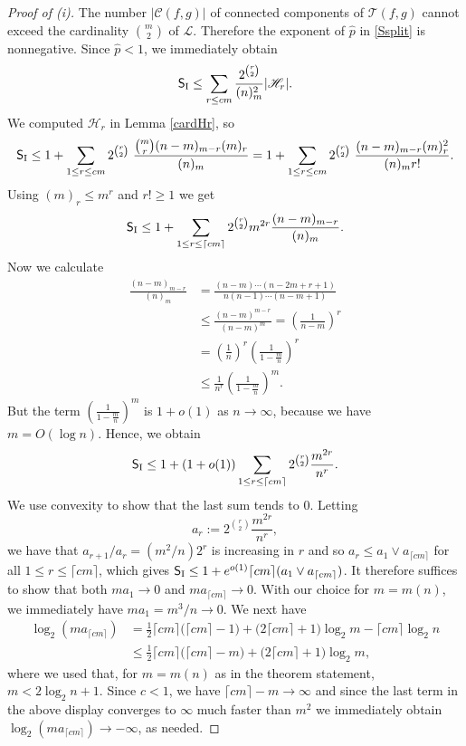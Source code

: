 \documentclass[reqno]{amsart}
\theoremstyle{theorem}
\theoremstyle{definition}
\theoremstyle{remark}
\def\LL{\mathscr{L}}
\def\TT{\mathscr{T}}
\def\CC{\mathscr{C}}
\def\HH{\mathscr{H}}
\newcommand{\1}{{\text{\Large $\mathfrak 1$}}}	%
\numberwithin{equation}{section}
\def\pmax{{\widehat p}}
\def\SSSone{\mathsf S_{\text{\rm I}}}
\begin{document}
\begin{proof}[Proof of (i)]
The number $|\CC(f,g)|$ of connected components of $\TT(f,g)$
cannot exceed the cardinality $\binom{m}{2}$ of $\LL$. Therefore the exponent
of $\pmax$ in \eqref{Ssplit} is nonnegative. 
Since $\pmax < 1$, we immediately obtain
\[
\SSSone \le \sum_{r\le cm} \frac{2^{\binom{r}{2}}}{(n)_m^2} |\HH_r|.
\]
We computed $\HH_r$ in Lemma \ref{cardHr}, so
\[
\SSSone 
\le 1+ \sum_{1 \le r\le cm} 
2^{\binom{r}{2}}~ \frac{\binom{m}{r} (n-m)_{m-r} (m)_r}{(n)_m}
= 1+ \sum_{1 \le r\le cm} 
2^{\binom{r}{2}}~ \frac{(n-m)_{m-r} (m)_r^2}{(n)_m r!}.
\]
Using $(m)_r \le m^r$ and $r!\ge 1$ we get
\[
\SSSone 
\le 1 + \sum_{1\le r\le\lceil cm\rceil} 2^{\binom{r}{2}}
m^{2r} \frac{(n-m)_{m-r}}{(n)_m}.
\]
Now we calculate
\begin{align*}
\frac{(n-m)_{m-r}}{(n)_m}
&= \frac{(n-m) \cdots (n-2m+r+1)}{n(n-1) \cdots (n-m+1)} \\
&\le \frac{(n-m)^{m-r}}{(n-m)^m} = \left( \frac{1}{n-m} \right)^r \\
&= \left( \frac{1}{n} \right)^r \left( \frac{1}{1 - \frac{m}{n}} \right)^r \\
&\le \frac{1}{n^r} \left( \frac{1}{1 - \frac{m}{n}} \right)^m.
\end{align*}
But the term $\left( \frac{1}{1 - \frac{m}{n}} \right)^m$ is $1 + o(1)$ as
$n \rightarrow \infty$, because we have $m = O(\log n)$. Hence, we obtain
\[
\SSSone 
\le 1 + (1 + o(1)) \sum_{1\le r \le \lceil cm \rceil} 2^{\binom{r}{2}}
\frac{m^{2r}}{n^r}.
\]
We use convexity to show that the last sum tends to $0$. Letting
\[
a_r := 2^{\binom{r}{2}} \frac{m^{2r}}{n^r},
\]
we have that $a_{r+1}/a_r = (m^2/n) 2^r$ is increasing in $r$ and so
$a_r \le  a_1 \vee a_{\lceil cm \rceil}$ for all $1 \le r \le \lceil cm \rceil$,
which gives 
$\SSSone \le 1+e^{o(1)} \lceil cm \rceil (a_1\vee a_{\lceil cm \rceil})$.
It therefore suffices to show that both 
$m a_1 \to 0$ and $m a_{\lceil cm \rceil} \to 0$.
With our choice for $m=m(n)$, we immediately have
$m a_1 = {m^3}/{n} \to 0$.
We next have
\begin{align*} 
\log_2 (m a_{\lceil cm\rceil }) 
&= \frac12 \lceil cm\rceil \big(\lceil cm\rceil-1\big)
+\big(2\lceil cm\rceil+ 1\big) \log_2 m -\lceil cm\rceil\log_2 n
\\ 
&\le \frac12 \lceil cm\rceil \big(\lceil cm\rceil-m\big)
+ \big(2\lceil cm\rceil+ 1\big) \log_2 m,
\end{align*}
where we used that, for $m=m(n)$ as in the theorem statement, $m< 2 \log_2 n+1$.
Since $c<1$, we have $\lceil cm\rceil-m \to \infty$
and since the last term in the above display converges to $\infty$ much
faster than $m^2$ we immediately obtain $\log_2 (m a_{\lceil cm\rceil }) 
\to -\infty$, as needed.
\end{proof}
\end{document}
